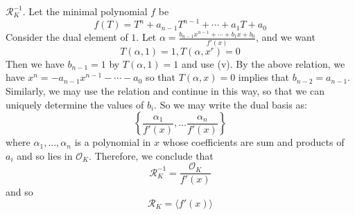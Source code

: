 \begin{enumerate}
\begin{enumerate}
    $\mathcal{R}^{-1}_K$. Let the minimal polynomial $f$ be
    $$f(T)=T^n+a_{n-1}T^{n-1}+\cdots+a_1T+a_0$$
    Consider the dual element of $1$. Let $\alpha=\frac{b_{n-1}x^{n-1}+\cdots+b_1x+b_0}{f'(x)}$, and we want
    $$T(\alpha,1)=1,T(\alpha,x^r)=0$$
     Then we have $b_{n-1}=1$ by $T(\alpha,1)=1$ and use (v). By the above relation, we have
    $x^n=-a_{n-1}x^{n-1}-\cdots-a_0$ so that $T(\alpha,x)=0$ implies that
    $b_{n-2}=a_{n-1}$. Similarly, we may use the relation and continue in this way, so that we can uniquely
    determine the values of $b_i$. So we may write the dual basis as:
    $$\left\{\frac{\alpha_1}{f'(x)},\ldots \frac{\alpha_n}{f'(x)}\right\}$$
    where $\alpha_1,\ldots,\alpha_n$ is a polynomial in $x$ whose coefficients are sum and products of $a_i$ and so
    lies in $\mathcal{O}_K$. Therefore, we conclude that
    $$\mathcal{R}^{-1}_K =\frac{\mathcal{O}_K}{f'(x)}$$
    and so
    $$\mathcal{R}_K=\langle f'(x) \rangle$$
    \end{enumerate}


\end{enumerate}

